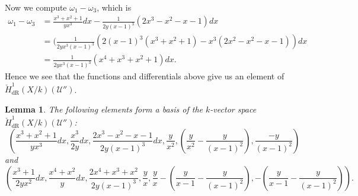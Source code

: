 \documentclass[draft, 11pt]{article} %
\theoremstyle{plain}
\newtheorem{lem}[defn]{Lemma}
\theoremstyle{remark}
\newcommand{\cU}{{\mathcal U}}
\newcommand{\cechderhamhone}{\check{H}_{\text {dR}}^1(X/k)}
\begin{document}
Now we compute $\omega_1 - \omega_3$, which is
\begin{align*}
\omega_1 - \omega_3 & = \frac{x^3 + x^2 + 1}{yx^3}dx -  \frac{1}{2y(x-1)^3}(2x^3-x^2-x-1)dx \\
& = (\frac{1}{2yx^3(x-1)^3} (2(x-1)^3(x^3 + x^2 + 1) - x^3(2x^2 - x^2 - x - 1)) dx \\
& = \frac{1}{2yx^3(x-1)^3} (x^4 + x^3 + x^2 + 1) dx.
\end{align*}
Hence we see that the functions and differentials above give us an element of $\cechderhamhone(\cU '')$.


\begin{lem}
The following elements form a basis of the $k$-vector space $\cechderhamhone(\cU '')$:
\begin{equation}\label{basis1}
\left(  \frac{x^3 + x^2 + 1}{yx^3}dx, \frac{x^3}{2y}dx, \frac{2x^3 - x^2 - x -1 }{2y(x-1)^3} dx, \frac{y}{x^2}, \left(\frac{y}{x^2} - \frac{y}{(x-1)^2} \right) , \frac{-y}{(x-1)^2} \right)
\end{equation}
and 
\begin{equation}\label{basis2}
\left( \frac{x^3+1}{2yx^2}dx, \frac{x^4+x^2}{y}dx, \frac{2x^4 + x^3 + x^2}{2y(x-1)^3}, \frac{y}{x}, \frac{y}{x} - \left(\frac{y}{x-1} - \frac{y}{(x-1)^2} \right), - \left( \frac{y}{x-1} - \frac{y}{(x-1)^2} \right)\right).
\end{equation}
\end{lem}
\end{document}
